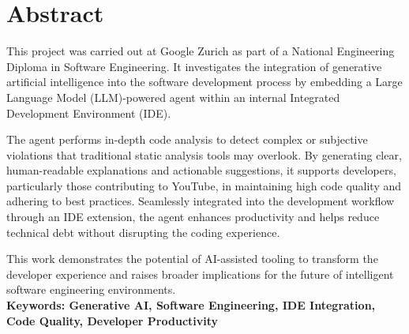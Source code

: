 \chapter*{Abstract}

This project was carried out at Google Zurich as part of a National Engineering Diploma in Software Engineering. It investigates the integration of generative artificial intelligence into the software development process by embedding a Large Language Model (LLM)-powered agent within an internal Integrated Development Environment (IDE).

The agent performs in-depth code analysis to detect complex or subjective violations that traditional static analysis tools may overlook. By generating clear, human-readable explanations and actionable suggestions, it supports developers, particularly those contributing to YouTube, in maintaining high code quality and adhering to best practices. Seamlessly integrated into the development workflow through an IDE extension, the agent enhances productivity and helps reduce technical debt without disrupting the coding experience.

This work demonstrates the potential of AI-assisted tooling to transform the developer experience and raises broader implications for the future of intelligent software engineering environments.\\

\textbf{Keywords: Generative AI, Software Engineering, IDE Integration, Code Quality, Developer Productivity}



